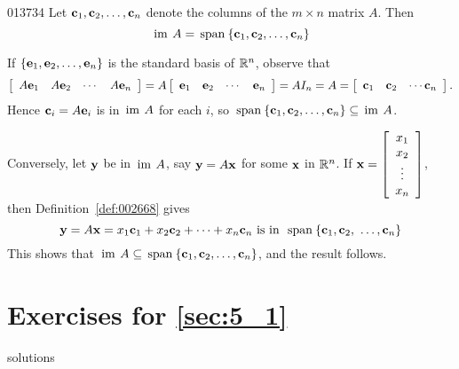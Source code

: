 \begin{example}{}{013734}
Let $\textbf{c}_{1}, \textbf{c}_{2}, \dots, \textbf{c}_{n}$ denote the columns of the $m \times n$ matrix $A$. Then
\begin{equation*}
\thinspace\operatorname{im \medspace} A = \thinspace\operatorname{span\medspace}\{\textbf{c}_1, \textbf{c}_2, \dots, \textbf{c}_n\}
\end{equation*}
\begin{solution}
If $\{\textbf{e}_{1}, \textbf{e}_{2}, \dots, \textbf{e}_{n}\}$ is the standard basis of $\mathbb{R}^n$, observe that
\begin{equation*}
\left[ \begin{array}{cccc}
A\textbf{e}_1 & A\textbf{e}_2 & \cdots & A\textbf{e}_n
\end{array}\right] = A \left[ \begin{array}{cccc}
\textbf{e}_1 & \textbf{e}_2 & \cdots & \textbf{e}_n \end{array}\right] = AI_n = A = \left[ \begin{array}{cccc}
\textbf{c}_1 & \textbf{c}_2 & \cdots  \textbf{c}_n \end{array}\right].
\end{equation*}
Hence $\textbf{c}_{i} = A\textbf{e}_{i}$ is in $\thinspace\operatorname{im\medspace} A$ for each $i$, so $\thinspace\operatorname{span\medspace}\{\textbf{c}_{1}, \textbf{c}_{2}, \dots, \textbf{c}_{n}\} \subseteq \thinspace\operatorname{ im\medspace} A$.

Conversely, let $\textbf{y}$ be in $\thinspace\operatorname{im\medspace} A$, say $\textbf{y} = A\textbf{x}$ for some $\textbf{x}$ in $\mathbb{R}^n$. If
$\textbf{x} = 
\left[ \begin{array}{c}
x_1 \\
x_2 \\
\vdots \\
x_n
\end{array} \right]
$, then Definition~\ref{def:002668} gives
\begin{equation*}
\textbf{y} = A\textbf{x} = x_1\textbf{c}_1 + x_2\textbf{c}_2 + \dots + x_n\textbf{c}_n \mbox{ is in } \thinspace\operatorname{span\medspace} \{\textbf{c}_1, \textbf{c}_2, \ \dots, \textbf{c}_n\}
\end{equation*}
This shows that $\thinspace\operatorname{im\medspace} A \subseteq \thinspace\operatorname{span\medspace}\{\textbf{c}_{1}, \textbf{c}_{2}, \dots, \textbf{c}_{n}\}$, and the result follows.
\end{solution}
\end{example}

\section*{Exercises for \ref{sec:5_1}}

\begin{Filesave}{solutions}
\end{Filesave}

